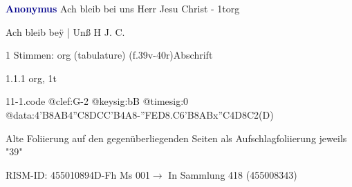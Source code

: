 \documentclass[twocolumn, 12pt]{book}
\begin{document}
\par \vspace{16pt} \textcolor{darkblue}{\textbf{Anonymus  }}\hfillplus{\textbf{[11]}}\newline Ach bleib bei uns Herr Jesu Christ - 1t\newline org
\par \begin{itshape}[f.39v, at left:] Ach bleib beÿ | Unß H J. C.\end{itshape} 
\par \textcolor{darkblue}{}  1 Stimmen: org (tabulature)  (f.39v-40r)\newline Abschrift
\par 1.1.1  org, 1t  
\begin{filecontents*}{11-1.code}
@clef:G-2
@keysig:bB
@timesig:0
@data:4'B{8AB}4''C{8DC}{C'B}4A8-{''FED}{8.C6'B8AB}x''C4D8C2(D)
\end{filecontents*}
\newline %
\par Alte Foliierung auf den gegenüberliegenden Seiten als Aufschlagfoliierung jeweils "39"
\par RISM-ID: 455010894\newline D-Fh  Ms 001\newline $\rightarrow$ In Sammlung 418 (455008343)
      
\end{document}
